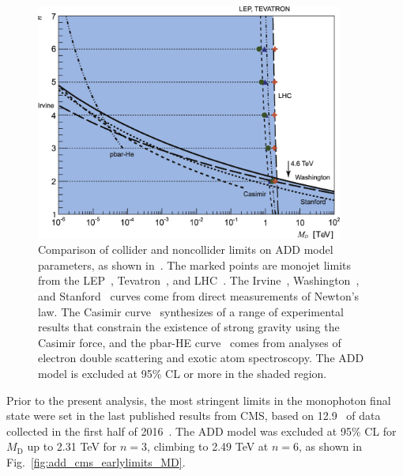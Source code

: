 \documentclass[oneside, letterpaper, 12pt, oldfontcommands]{memoir}
\begin{document}
\begin{figure}[hbtp]
  \begin{center}
    \includegraphics[width=0.90\textwidth]{Figures/add_noncollider_comparison_jpeg.jpg}
    \caption{
      Comparison of collider and noncollider limits on ADD model parameters, as shown in~\cite{ref:0264-9381/32/3/033001}.
      The marked points are monojet limits from the LEP~\cite{ref:9789812702227_0266}, Tevatron~\cite{ref:PhysRevLett.101.181602}, and LHC~\cite{ref:j.physletb.2011.10.006, ref:PhysRevLett.110.011802, ref:0264-9381/32/3/033001}.
      The Irvine~\cite{ref:PhysRevD.32.3084, ref:PhysRevLett.44.1645}, Washington~\cite{ref:PhysRevLett.98.021101}, and Stanford~\cite{ref:PhysRevD.78.022002} curves come from direct measurements of Newton's law.
      The Casimir curve~\cite{ref:0264-9381/32/3/033001} synthesizes of a range of  experimental results that constrain the existence of strong gravity using the Casimir force,
      and the pbar-HE curve~\cite{ref:epjconf/20146605021, ref:0264-9381/32/3/033001} comes from analyses of electron double scattering and exotic atom spectroscopy.
      The ADD model is excluded at 95\% CL or more in the shaded region.
    }
    \label{fig:add_noncollider_comparison}
  \end{center}
\end{figure}

Prior to the present analysis, the most stringent limits in the monophoton final state were set in the last published results from CMS,
based on 12.9 \fbinv\ of data collected in the first half of 2016~\cite{ref:JHEP10(2017)073}. The ADD model was excluded at 95\% CL for $M_\mathrm{D}$ up to 2.31 TeV
for $n = 3$, climbing to 2.49 TeV at $n = 6$, as shown in Fig.~\ref{fig:add_cms_earlylimits_MD}.
\end{document}
